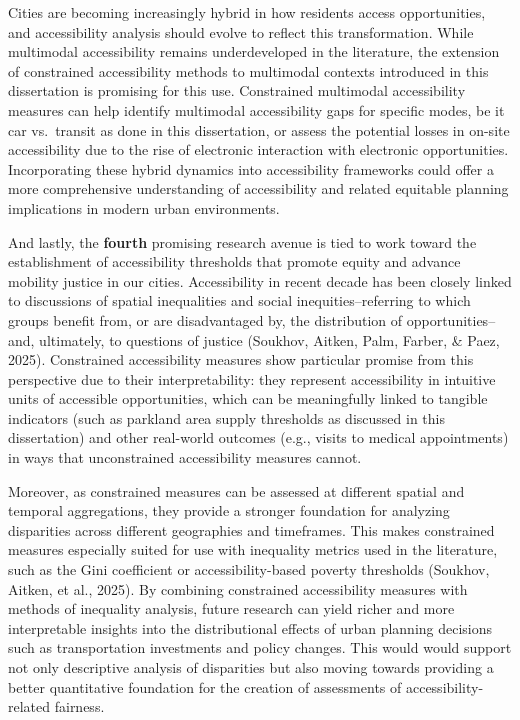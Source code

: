 \documentclass[
11pt, %
oneside, %
english, %
singlespacing, %
]{macthesis} %
\begin{document}
Cities are becoming increasingly hybrid in how residents access opportunities, and accessibility analysis should evolve to reflect this transformation. While multimodal accessibility remains underdeveloped in the literature, the extension of constrained accessibility methods to multimodal contexts introduced in this dissertation is promising for this use. Constrained multimodal accessibility measures can help identify multimodal accessibility gaps for specific modes, be it car vs.~transit as done in this dissertation, or assess the potential losses in on-site accessibility due to the rise of electronic interaction with electronic opportunities. Incorporating these hybrid dynamics into accessibility frameworks could offer a more comprehensive understanding of accessibility and related equitable planning implications in modern urban environments.

And lastly, the \textbf{fourth} promising research avenue is tied to work toward the establishment of accessibility thresholds that promote equity and advance mobility justice in our cities. Accessibility in recent decade has been closely linked to discussions of spatial inequalities and social inequities--referring to which groups benefit from, or are disadvantaged by, the distribution of opportunities--and, ultimately, to questions of justice (Soukhov, Aitken, Palm, Farber, \& Paez, 2025). Constrained accessibility measures show particular promise from this perspective due to their interpretability: they represent accessibility in intuitive units of accessible opportunities, which can be meaningfully linked to tangible indicators (such as parkland area supply thresholds as discussed in this dissertation) and other real-world outcomes (e.g., visits to medical appointments) in ways that unconstrained accessibility measures cannot.

Moreover, as constrained measures can be assessed at different spatial and temporal aggregations, they provide a stronger foundation for analyzing disparities across different geographies and timeframes. This makes constrained measures especially suited for use with inequality metrics used in the literature, such as the Gini coefficient or accessibility-based poverty thresholds (Soukhov, Aitken, et al., 2025). By combining constrained accessibility measures with methods of inequality analysis, future research can yield richer and more interpretable insights into the distributional effects of urban planning decisions such as transportation investments and policy changes. This would would support not only descriptive analysis of disparities but also moving towards providing a better quantitative foundation for the creation of assessments of accessibility-related fairness.
\end{document}
